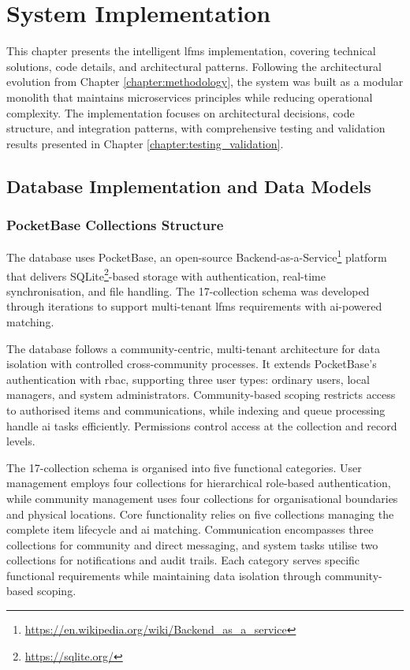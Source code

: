 \chapter{System Implementation} \label{chapter:implementation}

This chapter presents the intelligent \ac{lfms} implementation, covering technical solutions, code details, and architectural patterns. Following the architectural evolution from Chapter \ref{chapter:methodology}, the system was built as a modular monolith that maintains microservices principles while reducing operational complexity. The implementation focuses on architectural decisions, code structure, and integration patterns, with comprehensive testing and validation results presented in Chapter \ref{chapter:testing_validation}.


\section{Database Implementation and Data Models} \label{section:database_implementation}

\subsection{PocketBase Collections Structure} \label{subsection:pocketbase_collections}

The database uses PocketBase, an open-source Backend-as-a-Service\footnote{\url{https://en.wikipedia.org/wiki/Backend_as_a_service}} platform that delivers SQLite\footnote{\url{https://sqlite.org/}}-based storage with authentication, real-time synchronisation, and file handling. The 17-collection schema was developed through iterations to support multi-tenant \ac{lfms} requirements with \ac{ai}-powered matching.

The database follows a community-centric, multi-tenant architecture for data isolation with controlled cross-community processes. It extends PocketBase's authentication with \ac{rbac}, supporting three user types: ordinary users, local managers, and system administrators. Community-based scoping restricts access to authorised items and communications, while indexing and queue processing handle \ac{ai} tasks efficiently. Permissions control access at the collection and record levels.

The 17-collection schema is organised into five functional categories. User management employs four collections for hierarchical role-based authentication, while community management uses four collections for organisational boundaries and physical locations. Core functionality relies on five collections managing the complete item lifecycle and \ac{ai} matching. Communication encompasses three collections for community and direct messaging, and system tasks utilise two collections for notifications and audit trails. Each category serves specific functional requirements while maintaining data isolation through community-based scoping.

